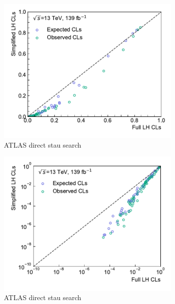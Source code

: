 \begin{figure}
	\centering
	\begin{subfigure}[b]{0.5\textwidth}
		\centering\includegraphics[width=\textwidth]{cls_scatter_directstaus_lin}
		\caption{ATLAS direct stau search~\cite{SUSY-2018-04}}
	\end{subfigure}\hfill
	\begin{subfigure}[b]{0.5\textwidth}
		\centering\includegraphics[width=\textwidth]{cls_scatter_directstaus_log}
		\caption{ATLAS direct stau search~\cite{SUSY-2018-04}}
	\end{subfigure}\hfill
	\begin{subfigure}[b]{0.5\textwidth}

\end{subfigure}
\end{figure}
